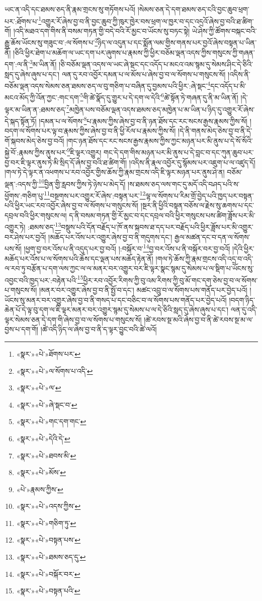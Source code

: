 ཡང་ན་འདི་དང་ཐམས་ཅད་ནི་རྣམ་གྲངས་སུ་གཏོགས་པའོ། །སེམས་ཅན་དེ་དག་ཐམས་ཅད་ངའི་བྱང་ཆུབ་ཕྲག་པར་:ཐོགས་པ་\footnote{«སྣར་»«པེ་»ཐོགས་པར་}འགྱུར་རོ་ཞེས་བྱ་བ་ནི་བྱང་ཆུབ་ཀྱི་ཁུར་ཁྱེར་བས་ཕྲག་ལ་ཁྱར་བ་དང་འདྲའོ་ཞེས་བྱ་བའི་ཐ་ཚིག་གོ། །འདི་མཐའ་དག་གིས་ནི་བསམ་གཏན་གྱི་བདེ་བའི་རོ་མྱང་བ་ཡོངས་སུ་བཏང་སྟེ། ཡེ་ཤེས་ཀྱི་ཚོགས་བསྐང་བའི་རྒྱུ་ཆོས་ཡོངས་སུ་གཟུང་བ་:ལ་སོགས་པ་\footnote{«སྣར་»«པེ་»ལ་སོགས་པ་འདི་}ཉིད་ལ་འདུན་པ་དང་སྨོན་ལམ་གྱིས་གནས་པར་བྱའོ་ཞེས་བསྟན་པ་ཡིན་ནོ། །ཅིའི་ཕྱིར་ཐེག་པ་མཆོག་ལ་ཡང་དག་པར་ཞུགས་པ་རྣམས་ཀྱི་ཕྱིར་བཅོམ་ལྡན་འདས་ཀྱིས་གསུངས་ཀྱི་གཞན་དག་:ལ་ནི་\footnote{«སྣར་»«པེ་»ལ་}མ་ཡིན་ནོ། །ཅི་བཅོམ་ལྡན་འདས་ལ་ཡང་ཞེ་སྡང་དང་འདོད་པ་མངའ་འམ་སྙམ་དུ་སེམས་ཤིང་དེ་ཅིའི་སླད་དུ་ཞེས་ཞུས་པ་དང་། ལན་དུ་རབ་འབྱོར་དམན་པ་ལ་མོས་པ་ཞེས་བྱ་བ་ལ་སོགས་པ་གསུངས་སོ། །འདིས་ནི་བཅོམ་ལྡན་འདས་སེམས་ཅན་ཐམས་ཅད་ལ་བུ་གཅིག་པ་བཞིན་དུ་བྱམས་པའི་ཕྱིར་:ཞེ་སྡང་\footnote{«སྣར་»«པེ་»ཞེ་སྡང་བ་}དང་འདོད་པ་མི་མངའ་མོད་ཀྱི་འོན་ཀྱང་:གང་དག་\footnote{«སྣར་»«པེ་»གང་དག་གང་}གི་ཚེ་སྣོད་དུ་གྱུར་པ་དེ་དག་ལ་དེའི་\footnote{«སྣར་»«པེ་»དེའི་དེ་}ཚེ་སྟོན་ཏེ་གཞན་དུ་ནི་མ་ཡིན་ནོ། །དེ་ལྟར་མ་ཡིན་ན་:ཐམས་ཅད་\footnote{«སྣར་»«པེ་»ཐབས་མི་}མཁྱེན་པས་བཅོམ་ལྡན་འདས་ཐམས་ཅད་མཁྱེན་པ་མ་ཡིན་པ་ཉིད་དུ་འགྱུར་རོ་ཞེས་དེ་སྐད་སྟོན་ཏོ། །དམན་པ་ལ་སོགས་\footnote{«སྣར་»«པེ་»མོས་}པ་རྣམས་ཀྱིས་ཞེས་བྱ་བ་ནི་ཉན་ཐོས་དང་རང་སངས་རྒྱས་རྣམས་ཀྱིས་སོ། །བདག་ལ་སོགས་པར་ལྟ་བ་རྣམས་ཀྱིས་ཞེས་བྱ་བ་ནི་ཕྱི་རོལ་པ་རྣམས་ཀྱིས་སོ། །དེ་ནི་གནས་མེད་ཅེས་བྱ་བ་ནི་དེ་གོ་སྐབས་མེད་ཅེས་བྱ་བའོ། །གང་ཉན་ཐོས་དང་རང་སངས་རྒྱས་རྣམས་ཀྱིས་ཀྱང་མཉན་པར་མི་ནུས་པ་དེ་སོ་སོའི་སྐྱེ་བོ་:རྣམས་ཀྱིས་ནུས་པར་\footnote{«པེ་»རྣམས་ཀྱིས་}ཇི་ལྟར་འགྱུར། གང་དེ་དག་གིས་མཉན་པར་མི་ནུས་པ་དེ་བླང་བ་དང་ཀུན་ཆུབ་པར་བྱ་བར་ཇི་ལྟར་ནུས་ཏེ་མི་སྲིད་དོ་ཞེས་བྱ་བའི་ཐ་ཚིག་གོ། །འདིས་ནི་རྣལ་འབྱོར་དུ་སྙོམས་པར་འཇུག་པ་ལ་འཛུད་དོ། །གལ་ཏེ་དེ་ལྟར་ན་འཕགས་པ་རབ་འབྱོར་གྱིས་ཆོས་ཀྱི་རྣམ་གྲངས་འདི་ཇི་ལྟར་མཉན་པར་ནུས་ཤེ་ན། བཅོམ་ལྡན་:འདས་ཀྱི་\footnote{«སྣར་»«པེ་»འདས་ཀྱིས་}བྱིན་གྱི་རླབས་ཀྱིས་ཏེ་ཉེས་པ་མེད་དོ། །ས་ཐམས་ཅད་ལས་གང་དུ་མདོ་འདི་བཤད་པའི་ས་ཕྱོགས་:གཅིག་པུ་\footnote{«སྣར་»«པེ་»གཅིག་ཏུ་}བསྔགས་པར་འགྱུར་རོ་ཞེས་:བསྟན་པར་\footnote{«སྣར་»«པེ་»བསྟན་པས་}ལྷ་ལ་སོགས་པ་རིམ་གྲོ་བྱེད་པའི་ཁྱད་པར་བསྟན་པའི་ཕྱིར་ཡང་རབ་འབྱོར་ཞེས་བྱ་བ་ལ་སོགས་པ་གསུངས་སོ། །སྔར་ནི་ཕྱིའི་བསྟན་བཅོས་ལ་རྗེས་སུ་ཆགས་པ་དང་དབྲལ་བའི་ཕྱིར་གསུངས་ལ། ད་ནི་བསམ་གཏན་གྱི་རོ་མྱང་བ་དང་དབྲལ་བའི་ཕྱིར་གསུངས་པས་ཚིག་ཟློས་པར་མི་འགྱུར་ཏེ། :ཐམས་ཅད་\footnote{«སྣར་»«པེ་»ཐམས་ཅད་དུ་}བསྡུས་པའི་དོན་བརྗོད་པ་ཁོ་ནས་སྐབས་ཐ་དད་པར་བརྗོད་པའི་ཕྱིར་ཟློས་པར་མི་འགྱུར་བར་ཤེས་པར་བྱའོ། །མཆོད་པར་འོས་པར་འགྱུར་ཞེས་བྱ་བ་ནི་གདུགས་དང་། རྒྱལ་མཚན་དང་བ་དན་ལ་སོགས་པས་སོ། །ཕྱག་བྱ་བར་འོས་པ་ནི་འདུད་པར་བྱ་བའོ། །:བསྐོར་བ་\footnote{«སྣར་»«པེ་»བསྐོར་བར་}བྱ་བར་འོས་པ་ནི་བསྐོར་བར་བྱ་བའོ། །དེའི་ཕྱིར་མཆོད་པར་འོས་པ་ལ་སོགས་པའི་ཆོས་དང་ལྡན་པས་མཆོད་རྟེན་ནོ། །གལ་ཏེ་ཆོས་ཀྱི་རྣམ་གྲངས་འདི་འདྲ་བ་འདི་ལ་རབ་ཏུ་བརྩོན་པ་དག་ལས་ཀྱང་ལ་ལ་མནར་བར་འགྱུར་བར་ཇི་ལྟར་སྣང་སྙམ་དུ་སེམས་པ་ལ་སྡིག་པ་ཡོངས་སུ་འབྱང་བའི་ཁྱད་པར་:བརྟེན་པའི་\footnote{«སྣར་»«པེ་»བསྟན་པའི་}ཕྱིར་རབ་འབྱོར་རིགས་ཀྱི་བུ་འམ་རིགས་ཀྱི་བུ་མོ་གང་དག་ཅེས་བྱ་བ་ལ་སོགས་པ་གསུངས་སོ། །མནར་བར་འགྱུར་ཞེས་བྱ་བ་ནི་སྤྱོ་བ་དང་། མཚང་འབྲུ་བ་ལ་སོགས་པས་གནོད་པར་བྱེད་པའོ། །ཡོངས་སུ་མནར་བར་འགྱུར་ཞེས་བྱ་བ་ནི་གསད་པ་དང་བཅིང་བ་ལ་སོགས་པས་གནོད་པར་བྱེད་པའོ། །བདག་ཉིད་ཆེན་པོ་དེ་ལྟ་བུ་དག་ལ་ཇི་ལྟར་མནར་བར་འགྱུར་སྙམ་དུ་སེམས་པ་ལ་དེ་ཅིའི་སླད་དུ་ཞེས་ཞུས་པ་དང་། ལན་དུ་འདི་ལྟར་སེམས་ཅན་དེ་དག་གི་ཞེས་བྱ་བ་ལ་སོགས་པ་གསུངས་སོ། །ཚེ་རབས་སྔ་མའི་ཞེས་བྱ་བ་ནི་ཚེ་རབས་སྔ་མ་ལ་བྱས་པ་དག་གོ། །ཚེ་འདི་ཉིད་ལ་ཞེས་བྱ་བ་ནི་ད་ལྟར་བྱུང་བའི་ཚེ་ལའོ། 